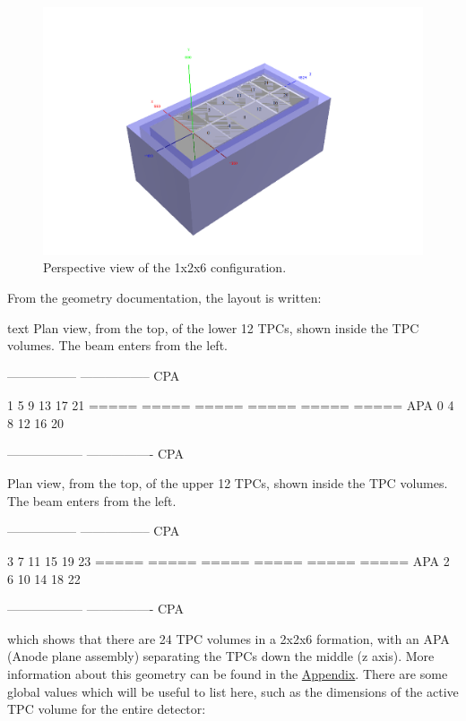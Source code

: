 \documentclass[8pt]{refart}
\begin{document}

\begin{figure}[H]
    \centering
    \includegraphics[width=\linewidth]{graphics/duneworkspace126_lowerhalf_numbered.png}
    \caption{Perspective view of the 1x2x6 configuration.}
    \label{fig:my_label}
\end{figure}
From the geometry documentation, the layout is written:
\begin{code}{text}
Plan view, from the top, of the lower 12 TPCs, 
shown inside the TPC volumes.  
The beam enters from the left.

   ----------------- -----------------  CPA

     1     5     9    13    17    21
   ===== ===== ===== ===== ===== =====  APA
     0     4     8    12    16    20

   ------------------ ----------------  CPA

Plan view, from the top, of the upper 12 TPCs, 
shown inside the TPC volumes.  
The beam enters from the left.

   ----------------- -----------------  CPA

     3     7    11    15    19    23
   ===== ===== ===== ===== ===== =====  APA
     2     6    10    14    18    22

   ------------------ ----------------  CPA
\end{code}
which shows that there are 24 TPC volumes in a 2x2x6 formation, with an APA (Anode plane assembly) separating the TPCs down the middle (z axis).  More information about this geometry can be found in the \hyperref[1x2x6appendix]{Appendix}.  There are some global values which will be useful to list here, such as the dimensions of the active TPC volume for the entire detector:
\end{document}
